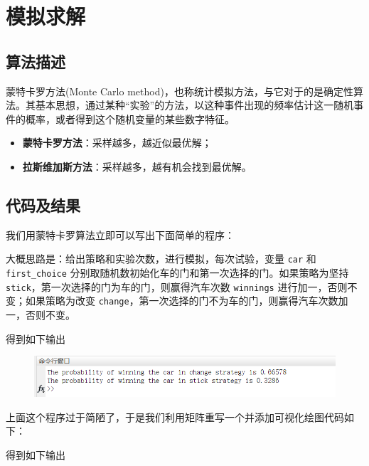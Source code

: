 \section{模拟求解}

\subsection{算法描述}

蒙特卡罗方法(Monte Carlo method)，也称统计模拟方法，与它对于的是确定性算法。其基本思想，通过某种“实验”的方法，以这种事件出现的频率估计这一随机事件的概率，或者得到这个随机变量的某些数字特征。

\begin{itemize}
\item \textbf{蒙特卡罗方法}：采样越多，越近似最优解；
\item \textbf{拉斯维加斯方法}：采样越多，越有机会找到最优解。
\end{itemize}

\subsection{代码及结果}

我们用蒙特卡罗算法立即可以写出下面简单的程序：

大概思路是：给出策略和实验次数，进行模拟，每次试验，变量 \verb|car| 和 \verb|first_choice| 分别取随机数初始化车的门和第一次选择的门。如果策略为坚持 \verb|stick|，第一次选择的门为车的门，则赢得汽车次数 \verb|winnings| 进行加一，否则不变；如果策略为改变 \verb|change|，第一次选择的门不为车的门，则赢得汽车次数加一，否则不变。



得到如下输出

\begin{figure}[H]
	\centering
	\includegraphics[width=12cm]{figure/out1.png}
\end{figure}

上面这个程序过于简陋了，于是我们利用矩阵重写一个并添加可视化绘图代码如下：



得到如下输出

